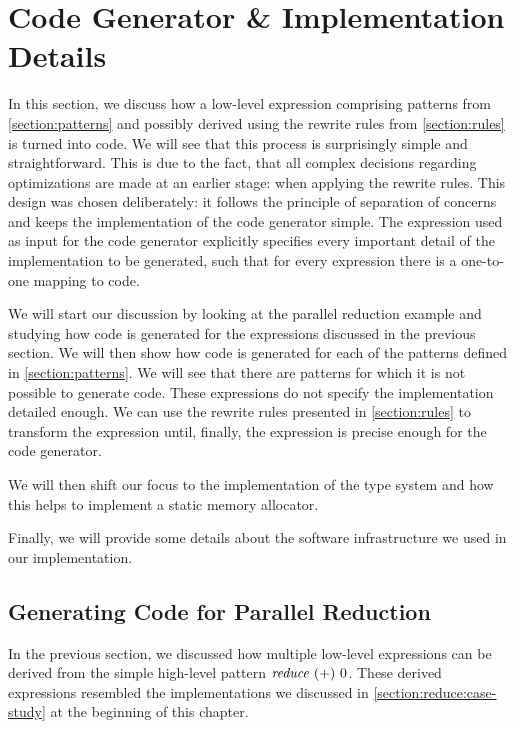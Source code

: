 \section{Code Generator \& Implementation Details}
\label{section:opencl:code:generator}
In this section, we discuss how a low-level expression comprising patterns from \autoref{section:patterns} and possibly derived using the rewrite rules from \autoref{section:rules} is turned into \OpenCL code.
We will see that this process is surprisingly simple and straightforward.
This is due to the fact, that all complex decisions regarding optimizations are made at an earlier stage: when applying the rewrite rules.
This design was chosen deliberately:
it follows the principle of separation of concerns and keeps the implementation of the code generator simple.
The expression used as input for the code generator explicitly specifies every important detail of the \OpenCL implementation to be generated, such that for every expression there is a one-to-one mapping to \OpenCL code.

We will start our discussion by looking at the parallel reduction example and studying how \OpenCL code is generated for the expressions discussed in the previous section.
We will then show how \OpenCL code is generated for each of the patterns defined in \autoref{section:patterns}.
We will see that there are patterns for which it is not possible to generate \OpenCL code.
These expressions do not specify the \OpenCL implementation detailed enough.
We can use the rewrite rules presented in \autoref{section:rules} to transform the expression until, finally, the expression is precise enough for the code generator.

We will then shift our focus to the implementation of the type system and how this helps to implement a static memory allocator.

Finally, we will provide some details about the software infrastructure we used in our implementation.

\subsection{Generating \OpenCL Code for Parallel Reduction}
In the previous section, we discussed how multiple low-level expressions can be derived from the simple high-level pattern $\text{\textit{reduce}}\ (+)\ 0$.
These derived expressions resembled the \OpenCL implementations we discussed in \autoref{section:reduce:case-study} at the beginning of this chapter.

